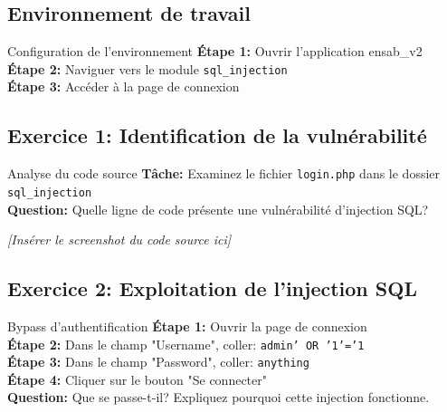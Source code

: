 \documentclass[12pt,a4paper]{article}
\begin{document}
\subsection{Environnement de travail}
\begin{exercicebox}{Configuration de l'environnement}
\textbf{Étape 1:} Ouvrir l'application ensab\_v2\\
\textbf{Étape 2:} Naviguer vers le module \texttt{sql\_injection}\\
\textbf{Étape 3:} Accéder à la page de connexion
\end{exercicebox}

\begin{answerbox}
\vspace{7cm}
\end{answerbox}

\subsection{Exercice 1: Identification de la vulnérabilité}

\begin{exercicebox}{Analyse du code source}
\textbf{Tâche:} Examinez le fichier \texttt{login.php} dans le dossier \texttt{sql\_injection}\\
\textbf{Question:} Quelle ligne de code présente une vulnérabilité d'injection SQL?
\end{exercicebox}

\begin{answerbox}
\vspace{7cm}
\end{answerbox}

\begin{screenshotbox}
\centering
\textit{[Insérer le screenshot du code source ici]}
\end{screenshotbox}

\subsection{Exercice 2: Exploitation de l'injection SQL}

\begin{exercicebox}{Bypass d'authentification}
\textbf{Étape 1:} Ouvrir la page de connexion\\
\textbf{Étape 2:} Dans le champ "Username", coller: \texttt{admin' OR '1'='1}\\
\textbf{Étape 3:} Dans le champ "Password", coller: \texttt{anything}\\
\textbf{Étape 4:} Cliquer sur le bouton "Se connecter"\\
\textbf{Question:} Que se passe-t-il? Expliquez pourquoi cette injection fonctionne.
\end{exercicebox}
\end{document}
